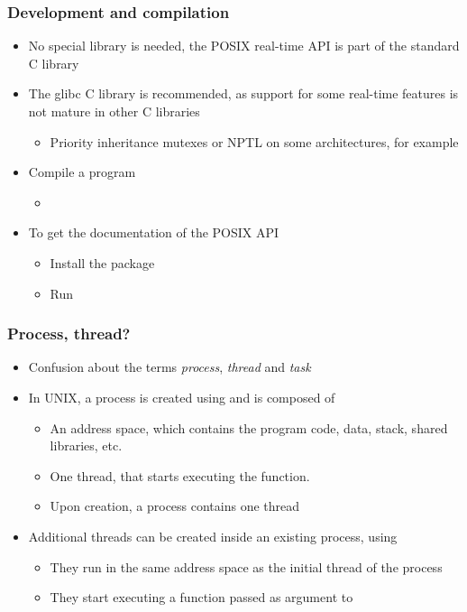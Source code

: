 \begin{frame}
  \frametitle{Development and compilation}
  \begin{itemize}
  \item No special library is needed, the POSIX real-time API is part
    of the standard C library
  \item The glibc C library is recommended, as support
    for some real-time features is not mature in other C libraries
    \begin{itemize}
    \item Priority inheritance mutexes or NPTL on some architectures,
      for example
    \end{itemize}
  \item Compile a program
    \begin{itemize}
    \item {}
    \end{itemize}
  \item To get the documentation of the POSIX API
    \begin{itemize}
    \item Install the  package
    \item Run 
    \end{itemize}
  \end{itemize}
\end{frame}

\begin{frame}
  \frametitle{Process, thread?}
  \begin{itemize}
  \item Confusion about the terms {\em process}, {\em thread} and {\em task}
  \item In UNIX, a process is created using  and is composed of
    \begin{itemize}
    \item An address space, which contains the program code, data, stack, shared
      libraries, etc.
    \item One thread, that starts executing the  function.
    \item Upon creation, a process contains one thread
    \end{itemize}
  \item Additional threads can be created inside an existing process, using
    \begin{itemize}
    \item They run in the same address space as the initial thread of
      the process
    \item They start executing a function passed as argument to
    \end{itemize}
  \end{itemize}
\end{frame}

